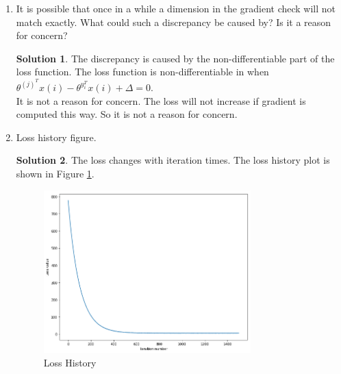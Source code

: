 \documentclass[]{book}
\theoremstyle{definition}
\newtheorem*{soln}{Solution}
\begin{document}
\begin{enumerate}
	\item It is possible that once in a while a dimension in the gradient check will not match exactly. What could such a discrepancy be caused by? Is it a reason for concern?
	\begin{soln}
		The discrepancy is caused by the non-differentiable part of the loss function. The loss function is non-differentiable in when $\theta^{(j)^{T}}x(i) - \theta^{y_i^{T}}x(i)+\Delta = 0$. \\
		It is not a reason for concern. The loss will not increase if gradient is computed this way. So it is not a reason for concern.  
	\end{soln}
	
	\item Loss history figure.
	\begin{soln}
		The loss changes with iteration times. The loss history plot is shown in Figure \ref{fig:lossHistory}.
		\begin{figure}[H]
			\centering
			\includegraphics[width=8cm]{lossHistory.png}
			\caption{Loss History}
			\label{fig:lossHistory}
		\end{figure}
	\end{soln}
	

\end{enumerate}
\end{document}
